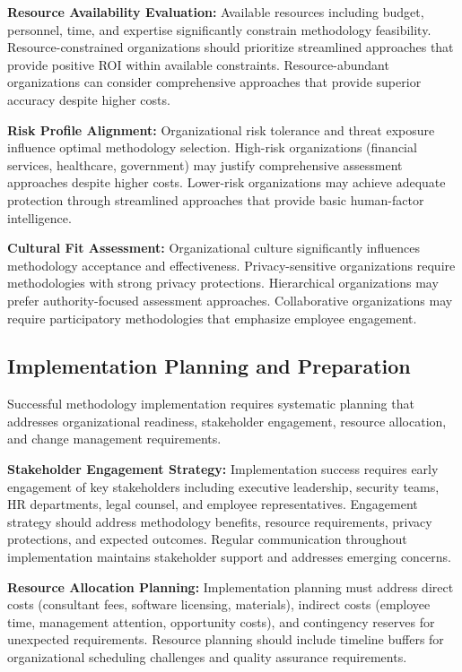 \documentclass[10pt, twocolumn]{article}
\begin{document}
\textbf{Resource Availability Evaluation:} Available resources including budget, personnel, time, and expertise significantly constrain methodology feasibility. Resource-constrained organizations should prioritize streamlined approaches that provide positive ROI within available constraints. Resource-abundant organizations can consider comprehensive approaches that provide superior accuracy despite higher costs.

\textbf{Risk Profile Alignment:} Organizational risk tolerance and threat exposure influence optimal methodology selection. High-risk organizations (financial services, healthcare, government) may justify comprehensive assessment approaches despite higher costs. Lower-risk organizations may achieve adequate protection through streamlined approaches that provide basic human-factor intelligence.

\textbf{Cultural Fit Assessment:} Organizational culture significantly influences methodology acceptance and effectiveness. Privacy-sensitive organizations require methodologies with strong privacy protections. Hierarchical organizations may prefer authority-focused assessment approaches. Collaborative organizations may require participatory methodologies that emphasize employee engagement.

\subsection{Implementation Planning and Preparation}

Successful methodology implementation requires systematic planning that addresses organizational readiness, stakeholder engagement, resource allocation, and change management requirements.

\textbf{Stakeholder Engagement Strategy:} Implementation success requires early engagement of key stakeholders including executive leadership, security teams, HR departments, legal counsel, and employee representatives. Engagement strategy should address methodology benefits, resource requirements, privacy protections, and expected outcomes. Regular communication throughout implementation maintains stakeholder support and addresses emerging concerns.

\textbf{Resource Allocation Planning:} Implementation planning must address direct costs (consultant fees, software licensing, materials), indirect costs (employee time, management attention, opportunity costs), and contingency reserves for unexpected requirements. Resource planning should include timeline buffers for organizational scheduling challenges and quality assurance requirements.
\end{document}
